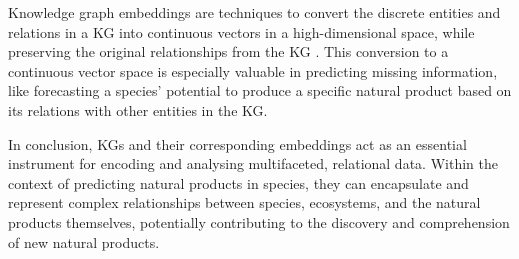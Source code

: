 \documentclass[
11pt, %
oneside, %
english, %
singlespacing, %
headsepline, %
chapterinoneline, %
]{MastersDoctoralThesis} %
\begin{document}
Knowledge graph embeddings are techniques to convert the discrete entities and relations in a KG into continuous vectors in a high-dimensional space, while preserving the original relationships from the KG \cite{wangKnowledgeGraphEmbedding2017}. This conversion to a continuous vector space is especially valuable in predicting missing information, like forecasting a species' potential to produce a specific natural product based on its relations with other entities in the KG.

In conclusion, KGs and their corresponding embeddings act as an essential instrument for encoding and analysing multifaceted, relational data. Within the context of predicting natural products in species, they can encapsulate and represent complex relationships between species, ecosystems, and the natural products themselves, potentially contributing to the discovery and comprehension of new natural products.


\appendix %


%
%
%

\renewcommand{\bibname}{References}




\end{document}
